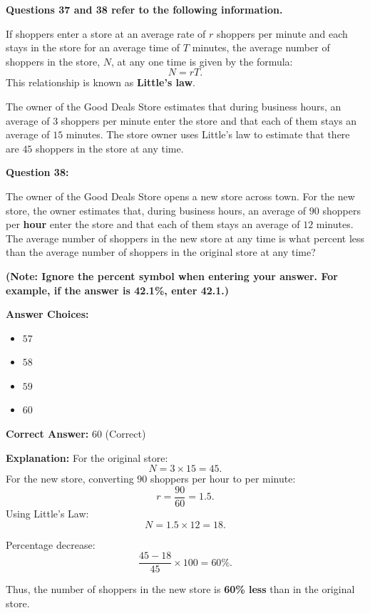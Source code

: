 \documentclass[12pt]{article}
\begin{document}
\begin{tcolorbox}[colback=green!10, colframe=green!50!black, title=Question 38: Little's Law (Problem Solving)]
\textbf{Questions 37 and 38 refer to the following information.}

If shoppers enter a store at an average rate of \( r \) shoppers per minute and each stays in the store for an average time of \( T \) minutes, the average number of shoppers in the store, \( N \), at any one time is given by the formula:
\[
N = rT.
\]
This relationship is known as \textbf{Little’s law}.

The owner of the Good Deals Store estimates that during business hours, an average of \( 3 \) shoppers per minute enter the store and that each of them stays an average of \( 15 \) minutes. The store owner uses Little’s law to estimate that there are \( 45 \) shoppers in the store at any time.

\vspace{5mm}
\textbf{Question 38:} 

The owner of the Good Deals Store opens a new store across town. For the new store, the owner estimates that, during business hours, an average of \( 90 \) shoppers per \textbf{hour} enter the store and that each of them stays an average of \( 12 \) minutes. The average number of shoppers in the new store at any time is what percent less than the average number of shoppers in the original store at any time?

\textbf{(Note: Ignore the percent symbol when entering your answer. For example, if the answer is 42.1\%, enter 42.1.)}

\textbf{Answer Choices:}
\begin{itemize}
    \item \( 57 \)
    \item \( 58 \)
    \item \( 59 \)
    \item \( 60 \) 
\end{itemize}

\textbf{Correct Answer:} \( 60 \) (Correct)

\textbf{Explanation:} 
For the original store:
\[
N = 3 \times 15 = 45.
\]
For the new store, converting \( 90 \) shoppers per hour to per minute:
\[
r = \frac{90}{60} = 1.5.
\]
Using Little's Law:
\[
N = 1.5 \times 12 = 18.
\]

Percentage decrease:
\[
\frac{45 - 18}{45} \times 100 = 60\%.
\]

Thus, the number of shoppers in the new store is \textbf{60\% less} than in the original store.
\end{tcolorbox}
\end{document}
